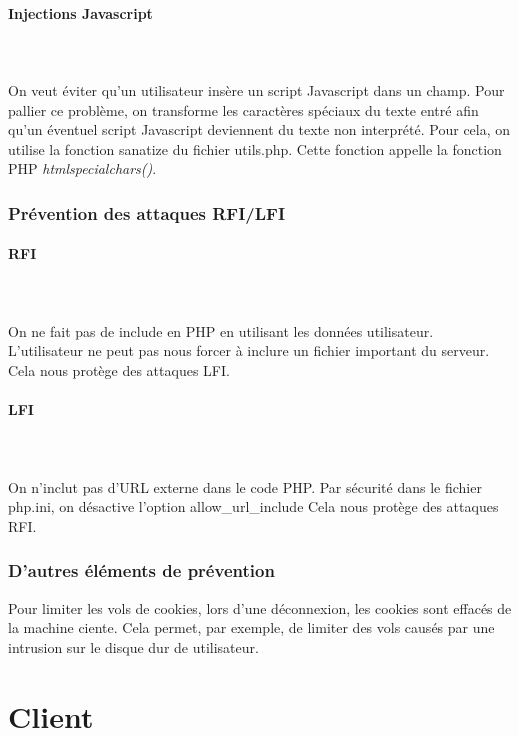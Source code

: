 \documentclass[a4paper]{article}
\begin{document}
\paragraph{Injections Javascript}
~~\\
\\
On veut éviter qu'un utilisateur insère un script Javascript dans un champ.
Pour pallier ce problème, on transforme les caractères spéciaux du texte entré afin
qu'un éventuel script Javascript deviennent du texte non interprété.
Pour cela, on utilise la fonction sanatize du fichier utils.php. Cette fonction appelle
la fonction PHP \textit{htmlspecialchars()}.
		
\subsubsection{Prévention des attaques RFI/LFI}
		
\paragraph{RFI}
~~\\
\\
On ne fait pas de include en PHP en utilisant les données utilisateur.
L'utilisateur ne peut pas nous forcer à inclure un fichier important du serveur.
Cela nous protège des attaques LFI.

\paragraph{LFI}
~~\\
\\
On n'inclut pas d'URL externe dans le code PHP.
Par sécurité dans le fichier php.ini, on désactive l'option allow\_url\_include 
Cela nous protège des attaques RFI.
		
\subsubsection{D'autres éléments de prévention}
		
Pour limiter les vols de cookies, lors d'une déconnexion, les cookies sont
effacés de la machine ciente. Cela permet, par exemple, de limiter des vols
causés par une intrusion sur le disque dur de utilisateur.
 		
\section{Client}
\end{document}
